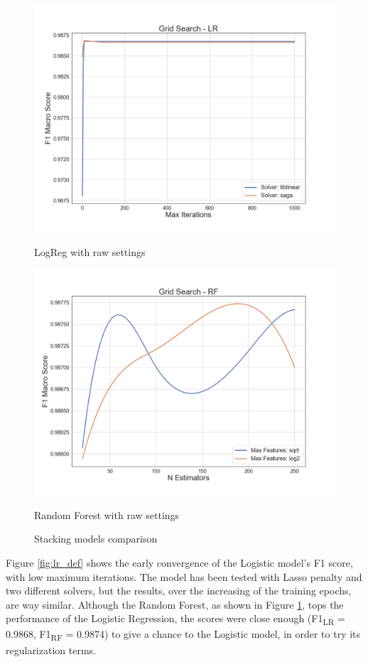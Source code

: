 \begin{figure}[htp!]
	\begin{multicols}{2}
		\includegraphics[width=\linewidth]{chapter5/figure/logreg_default.png}\par 
		\caption{LogReg with raw settings}
		\label{fig:lr_def}
		\includegraphics[width=\linewidth]{chapter5/figure/random_forest_default.png}\par 
		\caption{Random Forest with raw settings}
		\label{fig:rf_def}
	\end{multicols}
	\caption{Stacking models comparison}
\end{figure}

Figure \ref{fig:lr_def} shows the early convergence of the Logistic model's F1 score, with low maximum iterations. The model has been tested with Lasso penalty and two different solvers, but the results, over the increasing of the training epochs, are way similar.
Although the Random Forest, as shown in Figure \ref{fig:rf_def}, tops the performance of the Logistic Regression, the scores were close enough (F1\textsubscript{LR} = 0.9868,  F1\textsubscript{RF} = 0.9874) to give a chance to the Logistic model, in order to try its regularization terms.

